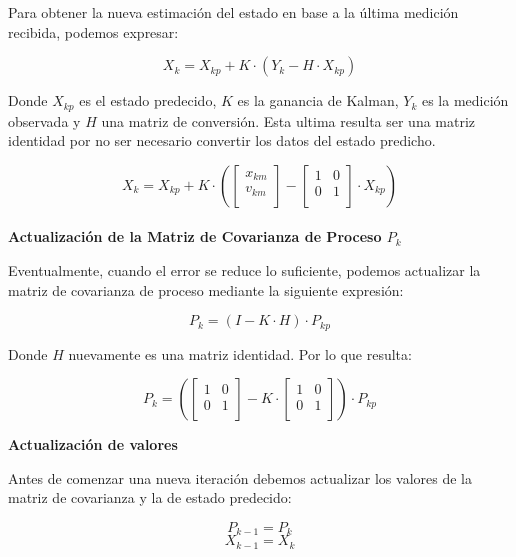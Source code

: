 Para obtener la nueva estimación del estado en base a la última medición recibida, podemos expresar:

$$ X_k = X_{kp} + K \cdot ( Y_k - H \cdot X_{kp} ) $$

Donde $X_{kp}$ es el estado predecido, $K$ es la ganancia de Kalman, $Y_k$ es la medición observada y $H$ una matriz de conversión. Esta ultima resulta ser una matriz identidad por no ser necesario convertir los datos del estado predicho.

$$ X_k =
    X_{kp}
    +
    K
    \cdot (
        \begin{bmatrix} x_{km} \\ v_{km} \\ \end{bmatrix}
        -
        \begin{bmatrix}
        1 & 0 \\
        0 & 1  \\
        \end{bmatrix}
        \cdot
        X_{kp}
    )
$$ \\

\textbf{Actualización de la Matriz de Covarianza de Proceso $P_k$} \mbox{} \vspace{8pt}

Eventualmente, cuando el error se reduce lo suficiente, podemos actualizar la matriz de covarianza de proceso mediante la siguiente expresión:

$$ P_k = ( I - K \cdot H ) \cdot P_{kp} $$

Donde $H$ nuevamente es una matriz identidad. Por lo que resulta:

$$ P_k =
    (
    \begin{bmatrix}
    1 & 0 \\
    0 & 1  \\
    \end{bmatrix}
    -
    K
    \cdot
    \begin{bmatrix}
    1 & 0 \\
    0 & 1  \\
    \end{bmatrix}
    )
    \cdot
    P_{kp}
$$

\textbf{Actualización de valores} \mbox{} \vspace{8pt}

Antes de comenzar una nueva iteración debemos actualizar los valores de la matriz de covarianza y la de estado predecido:

$$ P_{k-1} = P_k $$
$$ X_{k-1} = X_k $$